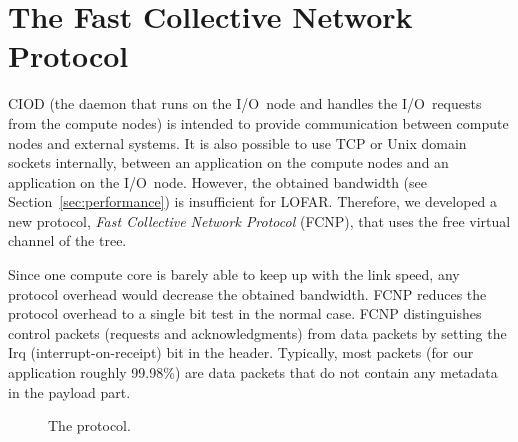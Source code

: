 \documentclass[journal]{IEEEtran}
\begin{document}


\section{The Fast Collective Network Protocol}
\label{sec:FCNP}

CIOD (the daemon that runs on the I/O~node and handles the I/O~requests from
the compute nodes) is intended to provide communication between compute nodes
and external systems.
It is also possible to use TCP or Unix domain sockets internally,
between an application on the compute nodes and an application on the I/O~node.
However, the obtained bandwidth (see Section~\ref{sec:performance}) is
insufficient for LOFAR.
Therefore, we developed a new protocol, \emph{Fast Collective Network
Protocol\/} (FCNP), that uses the free virtual channel of the tree.

Since one compute core is barely able to keep up with the link speed,
any protocol overhead would decrease the obtained bandwidth.
FCNP reduces the protocol overhead to a single bit test in the normal case.
FCNP distinguishes control packets (requests and acknowledgments) from data
packets by setting the Irq (interrupt-on-receipt) bit in the header.
Typically, most packets (for our application roughly 99.98\%) are data packets
that do not contain any metadata in the payload part.

\begin{figure}[h]
\hfill
{}
\caption{The protocol.}
\label{fig:FCNP-protocol}
\end{figure}
\end{document}
